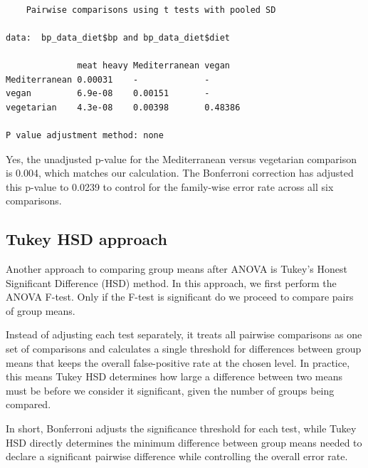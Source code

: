 \documentclass[
  letterpaper,
  8pt,
  a4paper]{book}
\newenvironment{Shaded}{\begin{snugshade}}{\end{snugshade}}
\newcommand{\AttributeTok}[1]{\textcolor[rgb]{0.40,0.45,0.13}{#1}}
\newcommand{\FunctionTok}[1]{\textcolor[rgb]{0.28,0.35,0.67}{#1}}
\newcommand{\NormalTok}[1]{\textcolor[rgb]{0.00,0.23,0.31}{#1}}
\newcommand{\SpecialCharTok}[1]{\textcolor[rgb]{0.37,0.37,0.37}{#1}}
\newcommand{\StringTok}[1]{\textcolor[rgb]{0.13,0.47,0.30}{#1}}
\newcounter{none} %
\begin{document}
\begin{Shaded}
\end{Shaded}

\begin{verbatim}

    Pairwise comparisons using t tests with pooled SD 

data:  bp_data_diet$bp and bp_data_diet$diet 

              meat heavy Mediterranean vegan  
Mediterranean 0.00031    -             -      
vegan         6.9e-08    0.00151       -      
vegetarian    4.3e-08    0.00398       0.48386

P value adjustment method: none 
\end{verbatim}

Yes, the unadjusted p-value for the Mediterranean versus vegetarian
comparison is 0.004, which matches our calculation. The Bonferroni
correction has adjusted this p-value to 0.0239 to control for the
family-wise error rate across all six comparisons.

\subsection*{Tukey HSD approach}\label{tukey-hsd-approach}

Another approach to comparing group means after ANOVA is Tukey's Honest
Significant Difference (HSD) method. In this approach, we first perform
the ANOVA F-test. Only if the F-test is significant do we proceed to
compare pairs of group means.

Instead of adjusting each test separately, it treats all pairwise
comparisons as one set of comparisons and calculates a single threshold
for differences between group means that keeps the overall
false-positive rate at the chosen level. In practice, this means Tukey
HSD determines how large a difference between two means must be before
we consider it significant, given the number of groups being compared.

In short, Bonferroni adjusts the significance threshold for each test,
while Tukey HSD directly determines the minimum difference between group
means needed to declare a significant pairwise difference while
controlling the overall error rate.
\end{document}
